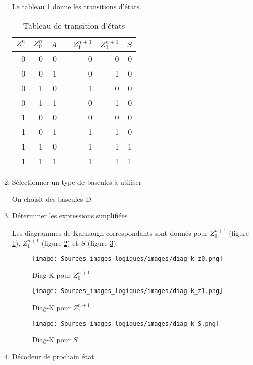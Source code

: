\documentclass[11pt]{article}
\begin{document}
\begin{enumerate}
Le tableau \ref{tab:org551ab56} donne les transitions d'états. 

\begin{table}[htbp]
\caption{\label{tab:org551ab56}Tableau de transition d'états}
\centering
\begin{tabular}{rrrlrrr}
\(Z_1^n\) & \(Z_0^n\) & \(A\) &  & \(Z_1^{n+1}\) & \(Z_0^{n+1}\) & \(S\)\\
\hline
0 & 0 & 0 &  & 0 & 0 & 0\\
0 & 0 & 1 &  & 0 & 1 & 0\\
0 & 1 & 0 &  & 1 & 0 & 0\\
0 & 1 & 1 &  & 0 & 1 & 0\\
1 & 0 & 0 &  & 0 & 0 & 0\\
1 & 0 & 1 &  & 1 & 1 & 0\\
1 & 1 & 0 &  & 1 & 1 & 1\\
1 & 1 & 1 &  & 1 & 1 & 1\\
\end{tabular}
\end{table}


\item Sélectionner un type de bascules à utiliser
\label{sec:org7350e9a}

On choisit des bascules D. 

\item Déterminer les expressions simplifiées
\label{sec:org5dec9b5}

Les diagrammes de Karnaugh correspondants sont donnés pour
\(Z_0^{n+1}\) (figure \ref{fig:org94f3b7a}), \(Z_1^{n+1}\) (figure
\ref{fig:org1823f2e}) et \(S\) (figure \ref{fig:orgd469b84}).

\begin{figure}[htbp]
\centering
\texttt{[image: Sources\_images\_logiques/images/diag-k\_z0.png]}
\caption{\label{fig:org94f3b7a}Diag-K pour \(Z_0^{n+1}\)}
\end{figure}

\begin{figure}[htbp]
\centering
\texttt{[image: Sources\_images\_logiques/images/diag-k\_z1.png]}
\caption{\label{fig:org1823f2e}Diag-K pour \(Z_1^{n+1}\)}
\end{figure}

\begin{figure}[htbp]
\centering
\texttt{[image: Sources\_images\_logiques/images/diag-k\_S.png]}
\caption{\label{fig:orgd469b84}Diag-K pour \(S\)}
\end{figure}

\item Décodeur de prochain état
\label{sec:orge40369f}


\end{enumerate}
\end{document}
